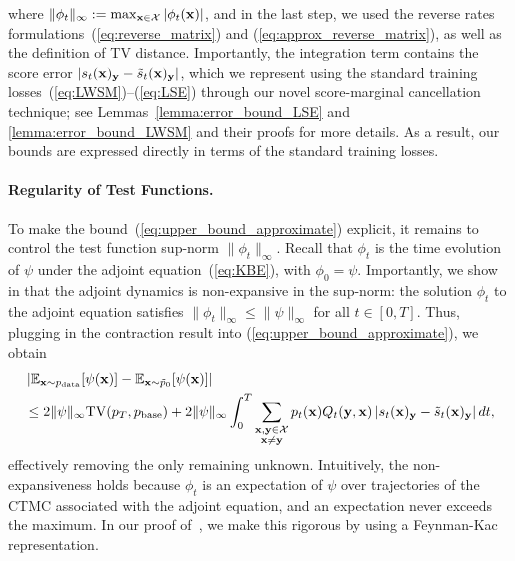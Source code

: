 \documentclass{article} %
\def\eqref#1{equation~\ref{#1}}
\newcommand{\bfx}{{\bf x}}
\newcommand{\bfy}{ {\bf y}}
\newcommand{\TV}{\mathrm{TV}}
\renewcommand{\eqref}[1]{\textup{(\ref{#1})}}
\begin{document}
where $\| \phi_t \|_\infty := \max_{\bfx \in \mathcal{X}} |\phi_t(\bfx)|$, and in the last step, we used the reverse rates formulations~\eqref{eq:reverse_matrix} and \eqref{eq:approx_reverse_matrix}, as well as the definition of TV distance. Importantly, the integration term contains the score error $\left| {s}_t(\bfx)_\bfy - \tilde{s}_t(\bfx)_\bfy  \right|$, which we represent using the standard training losses~\eqref{eq:LWSM}--\eqref{eq:LSE} through our novel score-marginal cancellation technique; see Lemmas~\ref{lemma:error_bound_LSE} and \ref{lemma:error_bound_LWSM} and their proofs for more details. As a result, our bounds are expressed directly in terms of the standard training losses.


\paragraph{Regularity of Test Functions.} To make the bound~\eqref{eq:upper_bound_approximate} explicit, it remains to control the test function sup-norm $\| \phi_t \|_\infty$. Recall that $\phi_t$ is the time evolution of $\psi$ under the adjoint equation~\eqref{eq:KBE}, with $\phi_0=\psi$. Importantly, we show in  that the adjoint dynamics is non-expansive in the sup-norm: the solution $\phi_t$ to the adjoint equation satisfies $\| \phi_t \|_\infty \leq \| \psi \|_\infty$ for all $t \in [0,T]$. Thus, plugging in the contraction result into \eqref{eq:upper_bound_approximate}, we obtain
\begin{align}\label{eq:upper_bound_approximate_explicit}
\begin{split}
     &\left| \mathbb{E}_{\bfx \sim p_{\mathrm{data}}}[\psi(\bfx)] - \mathbb{E}_{\bfx \sim \tilde{p}_0}[\psi(\bfx)] \right| \\
     &\leq 2 \| \psi \|_\infty \TV(p_T, p_{\rm base}) + 2 \| \psi \|_\infty \int_0^T \sum_{\substack{\bfx,\bfy\in\mathcal{X} \\ \bfx\neq \bfy}}  p_t(\bfx) Q_t(\bfy, \bfx) \left| {s}_t(\bfx)_\bfy - \tilde{s}_t(\bfx)_\bfy  \right|  dt,
\end{split}
\end{align}
effectively removing the only remaining unknown. Intuitively, the non-expansiveness holds because $\phi_t$ is an expectation of $\psi$ over trajectories of the CTMC associated with the adjoint equation, and an expectation never exceeds the maximum. In our proof of~, we make this rigorous by using a Feynman-Kac representation.
\end{document}

